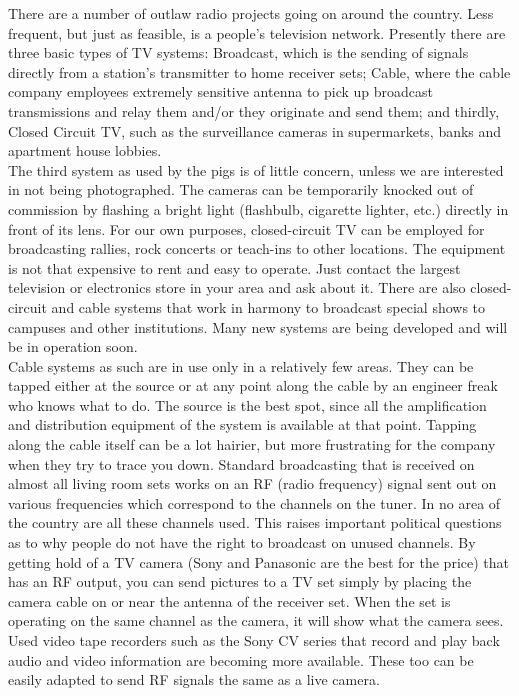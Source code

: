 \documentclass[11pt,twoside,a4paper]{book}
\begin{document}
	There are a number of outlaw radio projects going on around the country. Less frequent, but just as feasible, is a people's television network. Presently there are three basic types of TV systems: Broadcast, which is the sending of signals directly from a station's transmitter to home receiver sets; Cable, where the cable company employees extremely sensitive antenna to pick up broadcast transmissions and relay them and/or they originate and send them; and thirdly, Closed Circuit TV, such as the surveillance cameras in supermarkets, banks and apartment house lobbies.~\\

The third system as used by the pigs is of little concern, unless we are interested in not being photographed. The cameras can be temporarily knocked out of commission by flashing a bright light (flashbulb, cigarette lighter, etc.) directly in front of its lens. For our own purposes, closed-circuit TV can be employed for broadcasting rallies, rock concerts or teach-ins to other locations. The equipment is not that expensive to rent and easy to operate. Just contact the largest television or electronics store in your area and ask about it. There are also closed-circuit and cable systems that work in harmony to broadcast special shows to campuses and other institutions. Many new systems are being developed and will be in operation soon.~\\

Cable systems as such are in use only in a relatively few areas. They can be tapped either at the source or at any point along the cable by an engineer freak who knows what to do. The source is the best spot, since all the amplification and distribution equipment of the system is available at that point. Tapping along the cable itself can be a lot hairier, but more frustrating for the company when they try to trace you down. Standard broadcasting that is received on almost all living room sets works on an RF (radio frequency) signal sent out on various frequencies which correspond to the channels on the tuner. In no area of the country are all these channels used. This raises important political questions as to why people do not have the right to broadcast on unused channels. By getting hold of a TV camera (Sony and Panasonic are the best for the price) that has an RF output, you can send pictures to a TV set simply by placing the camera cable on or near the antenna of the receiver set. When the set is operating on the same channel as the camera, it will show what the camera sees. Used video tape recorders such as the Sony CV series that record and play back audio and video information are becoming more available. These too can be easily adapted to send RF signals the same as a live camera.~\\
\end{document}
